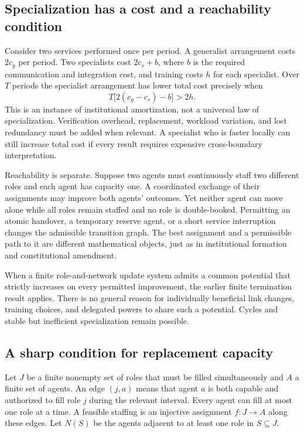 \documentclass[11pt,letterpaper]{article}
\theoremstyle{plain}
\theoremstyle{definition}
\theoremstyle{remark}
\begin{document}
\subsection{Specialization has a cost and a reachability condition}
Consider two services performed once per period. A generalist arrangement costs $2c_g$ per period. Two specialists cost $2c_s+b$, where $b$ is the required communication and integration cost, and training costs $h$ for each specialist. Over $T$ periods the specialist arrangement has lower total cost precisely when
\[
T\bigl[2(c_g-c_s)-b\bigr]>2h.
\]
This is an instance of institutional amortization, not a universal law of specialization. Verification overhead, replacement, workload variation, and lost redundancy must be added when relevant. A specialist who is faster locally can still increase total cost if every result requires expensive cross-boundary interpretation.

Reachability is separate. Suppose two agents must continuously staff two different roles and each agent has capacity one. A coordinated exchange of their assignments may improve both agents' outcomes. Yet neither agent can move alone while all roles remain staffed and no role is double-booked. Permitting an atomic handover, a temporary reserve agent, or a short service interruption changes the admissible transition graph. The best assignment and a permissible path to it are different mathematical objects, just as in institutional formation and constitutional amendment.

When a finite role-and-network update system admits a common potential that strictly increases on every permitted improvement, the earlier finite termination result applies. There is no general reason for individually beneficial link changes, training choices, and delegated powers to share such a potential. Cycles and stable but inefficient specialization remain possible.

\subsection{A sharp condition for replacement capacity}
Let $J$ be a finite nonempty set of roles that must be filled simultaneously and $A$ a finite set of agents. An edge $(j,a)$ means that agent $a$ is both capable and authorized to fill role $j$ during the relevant interval. Every agent can fill at most one role at a time. A feasible staffing is an injective assignment $f:J\to A$ along these edges. Let $N(S)$ be the agents adjacent to at least one role in $S\subseteq J$.
\end{document}
